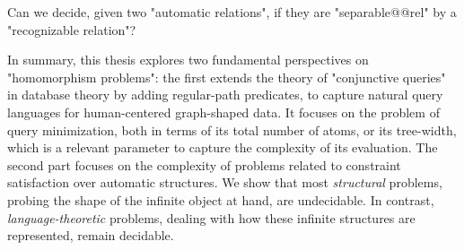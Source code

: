 \begin{openproblemintro}
	Can we decide, given two "automatic relations", if they are "separable@@rel"
	by a "recognizable relation"?
\end{openproblemintro}

In summary, this thesis explores two fundamental perspectives on "homomorphism problems":
the first extends the theory of "conjunctive queries" in database theory by adding regular-path
predicates, to capture natural query languages for human-centered graph-shaped data.
It focuses on the problem of query minimization, both in terms of
its total number of atoms, or its tree-width, which is a relevant parameter to
capture the complexity of its evaluation.
The second part focuses on the complexity of problems related to constraint satisfaction
over automatic structures. We show that most \emph{structural} problems, probing the shape of the 
infinite object at hand, are undecidable. In contrast, \emph{language-theoretic} 
problems, dealing with how these infinite structures are represented, remain decidable.